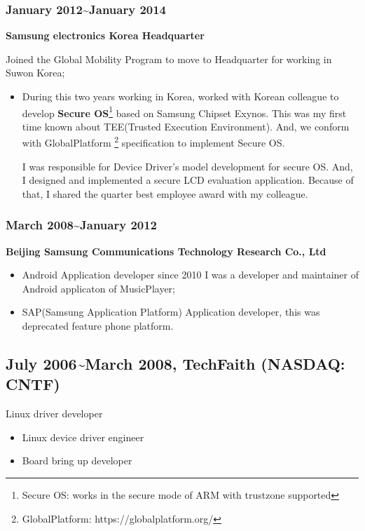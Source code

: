 \documentclass{article}
\begin{document}
\subsubsection{January 2012\~{}January 2014}
\textbf{Samsung electronics Korea Headquarter}

Joined the Global Mobility Program to move to Headquarter for working in Suwon Korea;

\begin{itemize}
\item{}During this two years working in Korea, worked with Korean colleague to develop
\textbf{Secure OS}\footnote{Secure OS: works in the secure mode of ARM with trustzone supported} based on Samsung Chipset Exynos.
This was my first time known about TEE(Trusted Execution Environment).
And, we conform with GlobalPlatform {\footnote {GlobalPlatform: https://globalplatform.org/}} specification to implement Secure OS.

I was responsible for Device Driver's model development for secure OS. And, I designed and implemented a secure LCD evaluation application. Because of that, I shared the quarter best employee award with my colleague.

\end{itemize}

\subsubsection{March 2008\~{}January 2012}
\textbf{Beijing Samsung Communications Technology Research Co., Ltd}

\begin{itemize}
\item{Android Application developer} since 2010
I was a developer and maintainer of Android applicaton of MusicPlayer;

\item{SAP(Samsung Application Platform) Application developer}, this was deprecated feature phone platform.
\end{itemize}

\subsection{July 2006\~{}March 2008, TechFaith (NASDAQ: CNTF)}
Linux driver developer
\begin{itemize}
\item{Linux device driver engineer}

\item{Board bring up developer}

\end{itemize}
\end{document}

